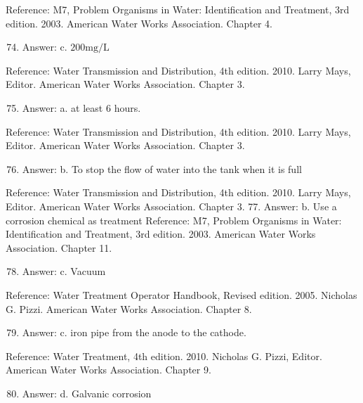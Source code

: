 \documentclass[10pt]{article}
\begin{document}
Reference: M7, Problem Organisms in Water: Identification and Treatment, 3rd edition. 2003. American Water Works Association. Chapter 4.

\begin{enumerate}
  \setcounter{enumi}{73}
  \item Answer: c. $200 \mathrm{mg} / \mathrm{L}$
\end{enumerate}

Reference: Water Transmission and Distribution, 4th edition. 2010. Larry Mays, Editor. American Water Works Association. Chapter 3.

\begin{enumerate}
  \setcounter{enumi}{74}
  \item Answer: a. at least 6 hours.
\end{enumerate}

Reference: Water Transmission and Distribution, 4th edition. 2010. Larry Mays, Editor. American Water Works Association. Chapter 3.

\begin{enumerate}
  \setcounter{enumi}{75}
  \item Answer: b. To stop the flow of water into the tank when it is full
\end{enumerate}

Reference: Water Transmission and Distribution, 4th edition. 2010. Larry Mays, Editor. American Water Works Association. Chapter 3. 77. Answer: b. Use a corrosion chemical as treatment Reference: M7, Problem Organisms in Water: Identification and Treatment, 3rd edition. 2003. American Water Works Association. Chapter 11.

\begin{enumerate}
  \setcounter{enumi}{77}
  \item Answer: c. Vacuum
\end{enumerate}

Reference: Water Treatment Operator Handbook, Revised edition. 2005. Nicholas G. Pizzi. American Water Works Association. Chapter 8.

\begin{enumerate}
  \setcounter{enumi}{78}
  \item Answer: c. iron pipe from the anode to the cathode.
\end{enumerate}

Reference: Water Treatment, 4th edition. 2010. Nicholas G. Pizzi, Editor. American Water Works Association. Chapter 9.

\begin{enumerate}
  \setcounter{enumi}{79}
  \item Answer: d. Galvanic corrosion
\end{enumerate}
\end{document}
